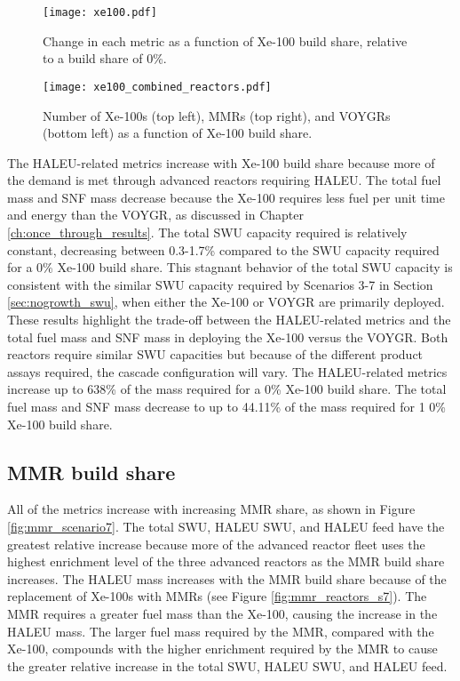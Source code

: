 \begin{figure}[ht]
    \centering
    \texttt{[image: xe100.pdf]}
    \caption{Change in each metric as a function of Xe-100 build share, 
    relative to a build share of 0\%.}
    \label{fig:xe100_scenario7}
\end{figure}

\begin{figure}[ht]
    \centering
    \texttt{[image: xe100\_combined\_reactors.pdf]}
    \caption{Number of Xe-100s (top left), MMRs (top right), and VOYGRs
    (bottom left) as a function of Xe-100 build share.}
    \label{fig:xe100_s7_combined_reactors}
\end{figure}

The \gls{HALEU}-related metrics increase with Xe-100 build share because more of 
the demand is met through advanced reactors requiring \gls{HALEU}. The total 
fuel mass and \gls{SNF} mass decrease because the 
Xe-100 requires less fuel per unit time and energy than the VOYGR, as discussed 
in Chapter \ref{ch:once_through_results}. The total \gls{SWU} capacity required 
is relatively constant, decreasing between 0.3-1.7\% compared to the \gls{SWU} capacity 
required for a 0\% Xe-100 build share. This stagnant behavior of the total 
\gls{SWU} capacity is consistent with the similar \gls{SWU} capacity required 
by Scenarios 3-7 in Section \ref{sec:nogrowth_swu}, when either the Xe-100 or 
VOYGR are primarily deployed. These results highlight the trade-off between the
\gls{HALEU}-related metrics and the total fuel mass and \gls{SNF} mass in deploying 
the Xe-100 versus the VOYGR. Both reactors require similar \gls{SWU} capacities 
but because of the different product assays required, the cascade configuration 
will vary. The \gls{HALEU}-related metrics increase up to 638\% of the 
mass required 
for a 0\% Xe-100 build share. The total fuel mass and \gls{SNF} mass decrease 
to up to 44.11\% of the mass required for 1 0\% Xe-100 build share. 

\subsection{MMR build share}
All of the metrics increase with increasing \gls{MMR} share, as shown 
in Figure \ref{fig:mmr_scenario7}. The total \gls{SWU}, \gls{HALEU} \gls{SWU}, 
and \gls{HALEU} feed have the greatest relative increase because more of the 
advanced reactor fleet uses the highest enrichment level of the three 
advanced reactors as the \gls{MMR} build share increases. The \gls{HALEU} mass 
increases with the \gls{MMR} build share because of the replacement of Xe-100s 
with \glspl{MMR} (see Figure \ref{fig:mmr_reactors_s7}).
The \gls{MMR} requires a greater fuel mass than the Xe-100, causing the increase 
in the \gls{HALEU} mass. The larger fuel mass required by the \gls{MMR}, compared 
with the Xe-100, compounds with the higher enrichment required by the \gls{MMR} 
to cause the greater relative increase in the total \gls{SWU}, \gls{HALEU} \gls{SWU}, 
and \gls{HALEU} feed. 

